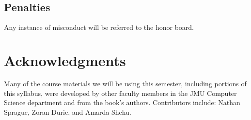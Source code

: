 \documentclass[11pt]{article}
\begin{document}
\subsection{Penalties}
\label{sec-5-3}
Any instance of misconduct will be referred to the
honor board.

\section*{Acknowledgments}
Many of the course materials we will be using this semester, including portions of this syllabus, were developed by other 
faculty members in the JMU Computer Science department and from the book's authors.
Contributors include: Nathan Sprague, Zoran Duric, and Amarda Shehu.
%
%
\end{document}
